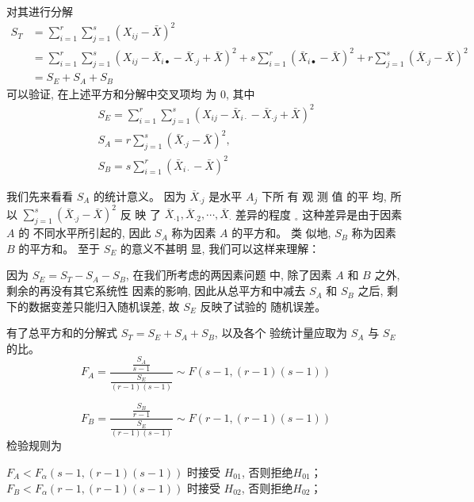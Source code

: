 对其进行分解
$$
\begin{aligned}
    S_{T}&=\sum_{i=1}^{r} \sum_{j=1}^{s}\left(X_{i j}-\bar{X}\right)^{2}\\ 
    &=\sum_{i=1}^{r} \sum_{j=1}^{s}\left(X_{i j}-\bar{X}_{i \bullet}-\bar{X}_{\cdot j}+\bar{X}\right)^{2}+s \sum_{i=1}^{r}\left(\bar{X}_{i \bullet}-\bar{X}\right)^{2}+r \sum_{j=1}^{s}\left(\bar{X}_{\cdot j}-\bar{X}\right)^{2} \\
    &=S_{E}+S_{A}+S_{B}
\end{aligned}
$$
可以验证, 在上述平方和分解中交叉项均
为 0, 其中
$$
\begin{array}{c}
S_{E}=\sum_{i=1}^{r} \sum_{j=1}^{s}\left(X_{i j}-\bar{X}_{i \cdot}-\bar{X}_{\cdot j}+\bar{X}\right)^{2} \\
S_{A}=r \sum_{j=1}^{s}\left(\bar{X}_{\cdot j}-\bar{X}\right)^{2}, \\
S_{B}= s \sum_{i=1}^{r}\left(\bar{X}_{i \cdot}-\bar{X}\right)^{2}
\end{array}
$$

我们先来看看 \( {S}_{A} \) 的统计意义。 因为 \( \overline{{X}}_{{\cdot} j} \) 是水平 \( {A}_{j} \) 下所
有 观 测 值 的平 均,  所 以 \( \sum_{j=1}^{s}\left(\bar{X}_{\cdot j}-\bar{X}\right)^{2} \) 反 映 了
\( \overline{{X}}_{{\cdot 1}}, \overline{{X}}_{\cdot 2}, \cdots, \overline{{X}}_{{\cdot}} \) 差异的程度 \( _{\circ} \) 这种差异是由于因素 \( {A} \) 的
不同水平所引起的, 因此 \( S_{A} \) 称为因素 \( A \) 的平方和。 类
似地,  \( {S}_{B} \) 称为因素 \( {B} \) 的平方和。 至于 \( {S}_{E} \) 的意义不甚明
显, 我们可以这样来理解：

因为 \( S_{E}=S_{T}-S_{A}-S_{B} \), 在我们所考虑的两因素问题 中, 除了因素 \( {A} \) 和 \( {B} \) 之外, 剩余的再没有其它系统性 因素的影响, 因此从总平方和中减去 \( {S}_{A} \) 和 \( {S}_{B} \) 之后, 剩 下的数据变差只能归入随机误差, 故 \( S_{E} \) 反映了试验的 随机误差。 

有了总平方和的分解式 \( S_{T}=S_{E}+S_{A}+S_{B} \), 以及各个
验统计量应取为 \( {S}_{A} \) 与 \( {S}_{E} \) 的比。 
$$
F_{A}=\frac{\frac{S_{A}}{s-1}}{\frac{S_{E}}{(r-1)(s-1)}} \sim F(s-1,(r-1)(s-1))
$$

$$
F_{B}=\frac{\frac{{S}_{B}}{{r}-{1}}}{\frac{{S}_{E}}{({r}-{1})(s-{1})}} \sim {F}({r}-{1},({r}-{1})({s}-{1}))
$$
检验规则为

\( F_{A}<F_{\alpha}(s-1,(r-1)(s-1)) \) 时接受 \( H_{01} \), 否则拒绝\( H_{01} \)；
\( F_{B}<F_{\alpha}(r-1,(r-1)(s-1)) \) 时接受 \( H_{02} \), 否则拒绝\( H_{02} \)；

